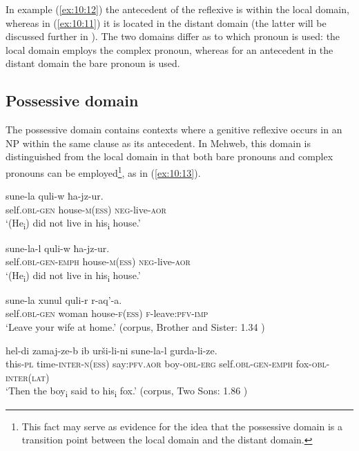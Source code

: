 ﻿\documentclass[output=paper]{langsci/langscibook}
\begin{document}
In example (\ref{ex:10:12}) the antecedent of the reflexive is within the local
domain, whereas in (\ref{ex:10:11}) it is located in the distant domain (the latter
will be discussed further in ). The two domains differ as to
which pronoun is used: the local domain employs the complex pronoun,
whereas for an antecedent in the distant domain the bare pronoun is
used.
%

\subsection{Possessive domain}\label{possessive-domain}


The possessive domain contains contexts where a genitive reflexive
occurs in an NP within the same clause as its antecedent. In Mehweb,
this domain is  %
distinguished from the local domain in that both bare
pronouns and complex pronouns can be employed\footnote{This fact may
  serve as evidence for the idea that the possessive domain is a
  transition point between the local domain and the distant domain.}, as
in (\ref{ex:10:13}).

\ea \label{ex:10:13} %
\ea %
\gll sune-la quli-w ħa-jz-ur.\\
self.\textsc{obl}-\textsc{gen} house-\textsc{m}(\textsc{ess}) \textsc{neg}-live-\textsc{aor}\\ 
\glt `(He\textsubscript{i}) did not live in his\textsubscript{i} house.'

\ex %
\gll sune-la-l quli-w ħa-jz-ur.\\
self.\textsc{obl}-\textsc{gen}-\textsc{emph} house-\textsc{m}(\textsc{ess}) \textsc{neg}-live-\textsc{aor}\\ 
\glt `(He\textsubscript{i}) did not live in his\textsubscript{i} house.'
\z

\ex \label{ex:10:14} %
\gll  sune-la xunul quli-r r-aq'-a.\\
self.\textsc{obl}-\textsc{gen} woman house-\textsc{f}(\textsc{ess}) \textsc{f}-leave:\textsc{pfv}-\textsc{imp}\\ 
\glt `Leave your wife at home.'
(corpus, Brother and Sister: 1.34 \citep{magometov1982})

\ex \label{ex:10:15} %
\gll  hel-di zamaj-ze-b ib urši-li-ni sune-la-l gurda-li-ze.\\
this-\textsc{pl} time-\textsc{inter}-\textsc{n}(\textsc{ess}) say:\textsc{pfv}.\textsc{aor} boy-\textsc{obl}-\textsc{erg} self.\textsc{obl}-\textsc{gen}-\textsc{emph} fox-\textsc{obl}-\textsc{inter}(\textsc{lat})\\ 
\glt `Then the boy\textsubscript{i} said to his\textsubscript{i} fox.'
(corpus, Two Sons: 1.86 \citep{magometov1982})
\z
\end{document}
